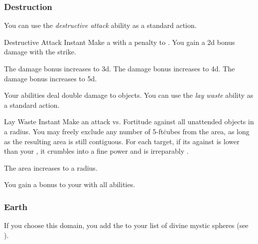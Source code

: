         \subsubsection{Destruction}
             You can use the \textit{destructive attack} ability as a standard action.
            \begin{instantability}{Destructive Attack}
                Instant
                \rankline
                Make a  with a  penalty to .
                You gain a \plus2d bonus damage with the strike.

                \rankline
                 The damage bonus increases to \plus3d.
                 The damage bonus increases to \plus4d.
                 The damage bonus increases to \plus5d.
            \end{instantability}
             Your abilities deal double damage to objects.
             You can use the \textit{lay waste} ability as a standard action.
            \begin{instantability}{Lay Waste}
                Instant
                \rankline
                Make an attack vs. Fortitude against all unattended objects in a \areamed radius.
                You may freely exclude any number of 5-ft\. cubes from the area, as long as the resulting area is still contiguous.
                \hit For each target, if its  against  is lower than your , it crumbles into a fine power and is irreparably .

                \rankline
                 The area increases to a \arealarge radius.
            \end{instantability}
             You gain a  bonus to your  with all abilities.

        \subsubsection{Earth}
            If you choose this domain, you add the   to your list of divine mystic spheres (see ).

